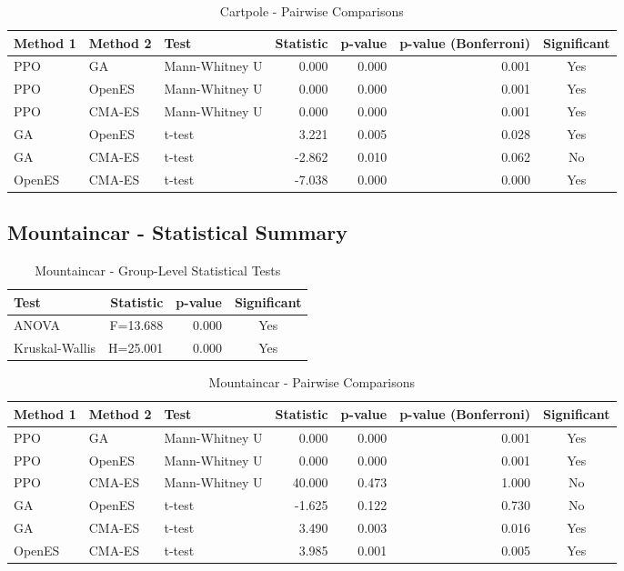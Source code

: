 \documentclass[12pt]{article}
\begin{document}
\begin{table}[h!]
\centering
\caption{Cartpole - Pairwise Comparisons}
\begin{tabular}{|l|l|l|r|r|r|c|}
\hline
\textbf{Method 1} & \textbf{Method 2} & \textbf{Test} & \textbf{Statistic} & \textbf{p-value} & \textbf{p-value (Bonferroni)} & \textbf{Significant} \\
\hline\hline
PPO & GA & Mann-Whitney U & 0.000 & 0.000 & 0.001 & Yes \\
PPO & OpenES & Mann-Whitney U & 0.000 & 0.000 & 0.001 & Yes \\
PPO & CMA-ES & Mann-Whitney U & 0.000 & 0.000 & 0.001 & Yes \\
GA & OpenES & t-test & 3.221 & 0.005 & 0.028 & Yes \\
GA & CMA-ES & t-test & -2.862 & 0.010 & 0.062 & No \\
OpenES & CMA-ES & t-test & -7.038 & 0.000 & 0.000 & Yes \\
\hline
\end{tabular}
\end{table}

\subsection{Mountaincar - Statistical Summary}

\begin{table}[h!]
\centering
\caption{Mountaincar - Group-Level Statistical Tests}
\begin{tabular}{|l|r|r|c|}
\hline
\textbf{Test} & \textbf{Statistic} & \textbf{p-value} & \textbf{Significant} \\
\hline\hline
ANOVA & F=13.688 & 0.000 & Yes \\
Kruskal-Wallis & H=25.001 & 0.000 & Yes \\
\hline
\end{tabular}
\end{table}

\begin{table}[h!]
\centering
\caption{Mountaincar - Pairwise Comparisons}
\begin{tabular}{|l|l|l|r|r|r|c|}
\hline
\textbf{Method 1} & \textbf{Method 2} & \textbf{Test} & \textbf{Statistic} & \textbf{p-value} & \textbf{p-value (Bonferroni)} & \textbf{Significant} \\
\hline\hline
PPO & GA & Mann-Whitney U & 0.000 & 0.000 & 0.001 & Yes \\
PPO & OpenES & Mann-Whitney U & 0.000 & 0.000 & 0.001 & Yes \\
PPO & CMA-ES & Mann-Whitney U & 40.000 & 0.473 & 1.000 & No \\
GA & OpenES & t-test & -1.625 & 0.122 & 0.730 & No \\
GA & CMA-ES & t-test & 3.490 & 0.003 & 0.016 & Yes \\
OpenES & CMA-ES & t-test & 3.985 & 0.001 & 0.005 & Yes \\
\hline
\end{tabular}
\end{table}
\end{document}
